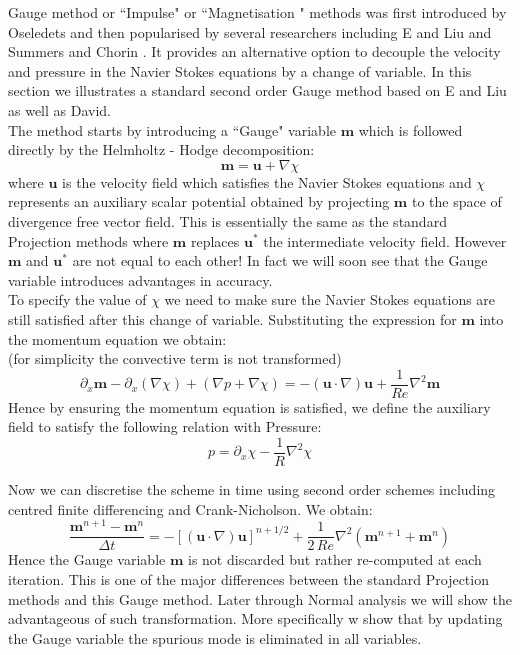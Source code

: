 Gauge method or ``Impulse" or ``Magnetisation " methods was first introduced by Oseledets and then popularised by several researchers including E and Liu and Summers and Chorin \cite{brown2001accurate,weinan2003gauge}. It provides an alternative option to decouple the velocity and pressure in the Navier Stokes equations by a change of variable. In this section we illustrates a standard second order Gauge method based on E and Liu as well as David. \\
The method starts by introducing a ``Gauge" variable $\textbf{m}$ which is followed directly by the Helmholtz - Hodge decomposition:
\begin{equation}
\textbf{m} = \textbf{u} + \nabla \chi
\end{equation}
where $\textbf{u}$ is the velocity field which satisfies the Navier Stokes equations and $\chi$ represents an  auxiliary scalar potential obtained by projecting $\textbf{m}$ to the space of divergence free vector field. This is essentially the same as the standard Projection methods where $\textbf{m}$ replaces $\textbf{u}^*$ the intermediate velocity field. However $\textbf{m}$ and $\textbf{u}^*$ are not equal to each other! In fact we will soon see that the Gauge variable introduces advantages in accuracy.\\

To specify the value of $\chi$ we need to make sure the Navier Stokes equations are still satisfied after this change of variable. Substituting the expression for $\textbf{m}$ into the momentum equation we obtain:\\
(for simplicity the convective term is not transformed)
\begin{equation*}
\partial_x\textbf{m} - \partial_x(\nabla \chi) + \left(\nabla p + \nabla \chi\right) = -(\textbf{u} \cdot \nabla)\textbf{u} + \dfrac{1}{Re}\nabla^2\textbf{m} 
\end{equation*}
Hence by ensuring the momentum equation is satisfied, we define the auxiliary field to satisfy the following relation with Pressure:
\begin{equation*}
p = \partial_x\chi - \dfrac{1}{R}\nabla^2\chi
\end{equation*}

Now we can discretise the scheme in time using second order schemes including centred finite differencing and Crank-Nicholson. We obtain:
\begin{equation*}
\dfrac{\textbf{m}^{n+1} - \textbf{m}^n}{\Delta t} = -\left[(\textbf{u} \cdot \nabla)\textbf{u}\right]^{n+1/2} + \dfrac{1}{2\,Re}\nabla^2\left(\textbf{m}^{n+1} + \textbf{m}^n\right)
\end{equation*}
Hence the Gauge variable $\textbf{m}$ is not discarded but rather re-computed at each iteration. This is one of the major differences between the standard Projection methods and this Gauge method. Later through Normal analysis we will show the advantageous of such transformation. More specifically w show that by updating the Gauge variable the spurious mode is eliminated in all variables.\\

